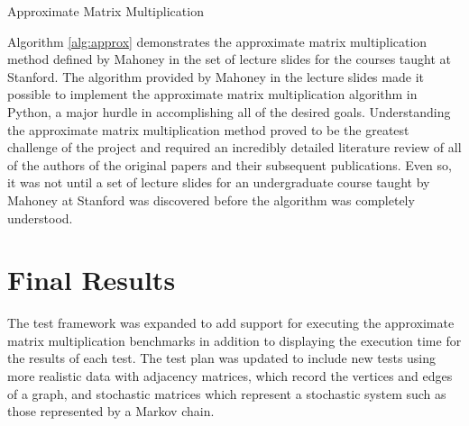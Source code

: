 \documentclass[oneside]{article}
\begin{document}
\begin{algorithm}[!ht]
  \SetAlgoNoLine
  \DontPrintSemicolon
\caption{Approximate Matrix Multiplication}
\label{alg:approx}
\end{algorithm}

Algorithm \ref{alg:approx} demonstrates the approximate matrix multiplication method defined by Mahoney in the set of lecture slides for the courses taught at Stanford\cite{mahoneyCS369M, mahoneyCS294}. The algorithm provided by Mahoney in the lecture slides made it possible to implement the approximate matrix multiplication algorithm in Python, a major hurdle in accomplishing all of the desired goals. Understanding the approximate matrix multiplication method proved to be the greatest challenge of the project and required an incredibly detailed literature review of all of the authors of the original papers and their subsequent publications. Even so, it was not until a set of lecture slides for an undergraduate course taught by Mahoney at Stanford was discovered before the algorithm was completely understood. 




\section{Final Results}

The test framework was expanded to add support for executing the approximate matrix multiplication benchmarks in addition to displaying the execution time for the results of each test. The test plan was updated to include new tests using more realistic data with adjacency matrices, which record the vertices and edges of a graph, and stochastic matrices which represent a stochastic system such as those represented by a Markov chain\cite{yegnanarayanan2013application}.
\end{document}
